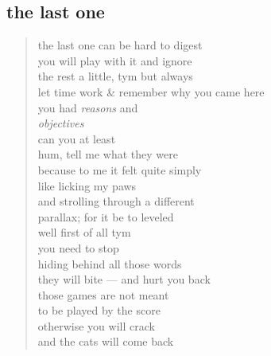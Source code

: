 \documentclass[11pt]{article}
\begin{document}
\subsection{the last one}
\label{sec:org523ac90}
\begin{verse}
the last one can be hard to digest\\
you will play with it  and ignore\\
the rest a little, tym but always\\
let time work \& remember why you came here\\
you had \textit{reasons} and\\
\textit{objectives}\\
\vspace*{1em}
can you at least\\
hum, tell me what they were\\
because to me it felt quite simply\\
like licking my paws\\
and strolling through a different\\
parallax; for it be to leveled\\
\vspace*{1em}
well first of all tym\\
you need to stop\\
hiding behind all those words\\
they will bite --- and hurt you back\\
those games are not meant\\
to be played by the score\\
otherwise you will crack\\
and the cats will come back\\
\end{verse}
\end{document}
